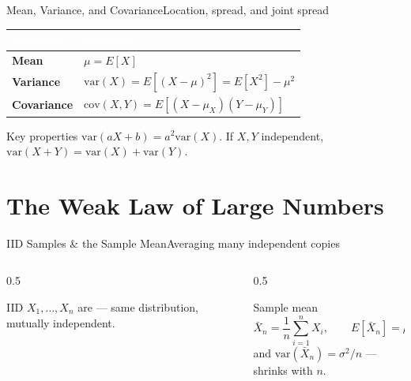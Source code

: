 \documentclass[aspectratio=169,11pt]{beamer}
\begin{document}
\begin{frame}{Mean, Variance, and Covariance}{Location, spread, and joint spread}
  \small
  \renewcommand{\arraystretch}{1.35}
  \begin{center}
  \begin{tabularx}{\textwidth}{@{}>{\bfseries}l >{\raggedright\arraybackslash}X@{}}
    \toprule
    \rowcolor{PrimaryDark}
    \textcolor{white}{Quantity} & \textcolor{white}{Formula} \\
    \midrule
    Mean & $\mu = E[X]$ \\
    \rowcolor{PrimaryLight!25}
    Variance & $\text{var}(X) = E[(X-\mu)^2] = E[X^2]-\mu^2$ \\
    Covariance & $\text{cov}(X,Y) = E[(X-\mu_X)(Y-\mu_Y)]$ \\
    \bottomrule
  \end{tabularx}
  \end{center}
  \begin{exampleblock}{Key properties}
    \small $\text{var}(aX+b) = a^2\text{var}(X)$. \quad If $X,Y$ independent,
    $\text{var}(X+Y) = \text{var}(X)+\text{var}(Y)$.
  \end{exampleblock}
\end{frame}

\section{The Weak Law of Large Numbers}

\begin{frame}{IID Samples \& the Sample Mean}{Averaging many independent copies}
  \begin{columns}[T]
    \begin{column}{0.5\textwidth}
      \begin{block}{IID}
        \small $X_1,\dots,X_n$ are  — same distribution, mutually independent.
      \end{block}
    \end{column}
    \begin{column}{0.5\textwidth}
      \begin{exampleblock}{Sample mean}
        \[ \bar X_n = \frac1n\sum_{i=1}^n X_i, \qquad E[\bar X_n] = \mu \]
        \small and $\text{var}(\bar X_n) = \sigma^2/n$ — shrinks with $n$.
      \end{exampleblock}
    \end{column}
  \end{columns}
\end{frame}
\end{document}
